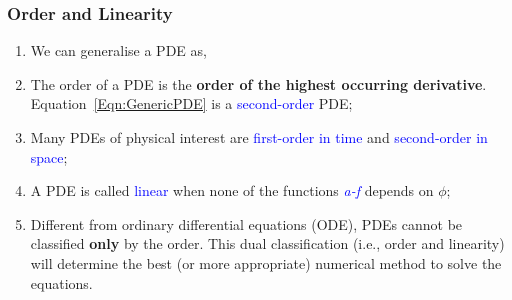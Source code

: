 \documentclass[10pt,compress]{beamer}
\begin{document}
\begin{frame}
 \frametitle{Order and Linearity}
   \begin{enumerate} 
      \item<1-> We can generalise a PDE as,
      \item<3-> The order of a PDE is the {\bf order of the highest occurring derivative}. Equation~\ref{Eqn:GenericPDE} is a \textcolor{blue}{second-order} PDE;
      \item<4-> Many PDEs of physical interest are \textcolor{blue}{first-order in time} and \textcolor{blue}{second-order in space};
      \item<5-> A PDE is called \textcolor{blue}{linear} when none of the functions \textcolor{blue}{\it a-f} depends on $\phi$; 
      \item<6-> Different from ordinary differential equations (ODE), PDEs cannot be classified {\bf only} by the order. This dual classification (i.e., order and linearity) will determine the best (or more appropriate) numerical method to solve the equations.
   \end{enumerate}
\end{frame}
\end{document}
